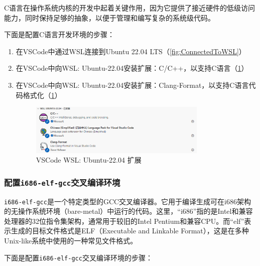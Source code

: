 C语言在操作系统内核的开发中起着关键作用，因为它提供了接近硬件的低级访问能力，同时保持足够的抽象，以便于管理和编写复杂的系统级代码。

下面是配置C语言开发环境的步骤：

\begin{enumerate}
    \item 在VSCode中通过WSL连接到Ubuntu 22.04 LTS（\cref{fig:ConnectedToWSL}）
    \item 在VSCode中向WSL: Ubuntu-22.04安装扩展：C/C++，以支持C语言（\cref{fig:VSCodeWSLExtensions}）
    \item 在VSCode中向WSL: Ubuntu-22.04安装扩展：Clang-Format，以支持C语言代码格式化（\cref{fig:VSCodeWSLExtensions}）
          \begin{figure}[htbp]
              \centering
              \includegraphics[width=0.8\textwidth]{figures/VSCodeWSLExtensions.png}
              \caption{VSCode WSL: Ubuntu-22.04 扩展}
              \label{fig:VSCodeWSLExtensions}
          \end{figure}
\end{enumerate}

\subsubsection{配置\texttt{i686-elf-gcc}交叉编译环境}

\texttt{i686-elf-gcc}是一个特定类型的GCC交叉编译器。它用于编译生成可在i686架构的无操作系统环境（bare-metal）中运行的代码。这里，“i686”指的是Intel和兼容处理器的32位指令集架构，通常用于较旧的Intel Pentium和兼容CPU。而“elf”表示生成的目标文件格式是ELF（Executable and Linkable Format），这是在多种Unix-like系统中使用的一种常见文件格式。

下面是配置\texttt{i686-elf-gcc}交叉编译环境的步骤：

